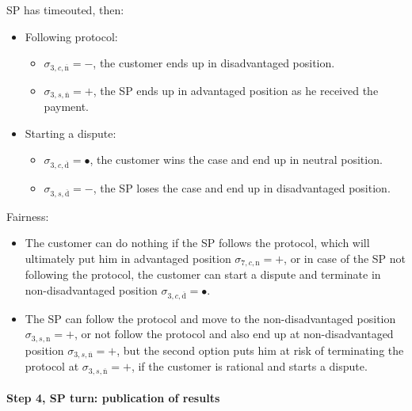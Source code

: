 \documentclass{ieeeaccess}
\begin{document}
SP has timeouted, then:

\begin{itemize}
\item
  Following protocol:

  \begin{itemize}
  
  \item
    \(\sigma_{3, c, \overline{\mathrm{n}}} = -\), the customer ends up in disadvantaged position.
  \item
    \(\sigma_{3, s, \overline{\mathrm{n}}} = +\), the SP ends up in
    advantaged position as he received the payment.
  \end{itemize}
\item
  Starting a dispute:

  \begin{itemize}
  
  \item
    \(\sigma_{3, c, \overline{\mathrm{d}}} = •\), the customer wins the case and end up in neutral position.
  \item
    \(\sigma_{3, s, \overline{\mathrm{d}}} = -\), the SP loses the case
    and end up in disadvantaged position.
  \end{itemize}
\end{itemize}

Fairness:

\begin{itemize}

\item
  The customer can do nothing if the SP follows the protocol, which will
  ultimately put him in advantaged position
  \(\sigma_{7, c, \mathrm{n}} = +\), or in case of the SP not following
  the protocol, the customer can start a dispute and terminate in
  non-disadvantaged position
  \(\sigma_{3, c, \overline{\mathrm{d}}} = •\).
\item
  The SP can follow the protocol and move to the non-disadvantaged
  position \(\sigma_{3, s, \mathrm{n}} = +\), or not follow the protocol
  and also end up at non-disadvantaged position
  \(\sigma_{3, s, \overline{\mathrm{n}}} = +\), but the second option
  puts him at risk of terminating the protocol at
  \(\sigma_{3, s, \overline{\mathrm{n}}} = +\), if the customer is
  rational and starts a dispute.
\end{itemize}

\paragraph{Step 4, SP turn: publication of results}\label{step-4-publication-of-results}
\end{document}
